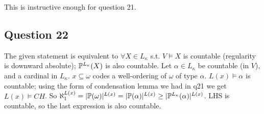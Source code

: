 \documentclass[a4paper]{article}
\begin{document}
This is instructive enough for question 21.

\subsection{Question 22}

The given statement is equivalent to $\forall X \in L_\kappa$ s.t. $V \vDash X$ is countable (regularity is downward absolute); $\P^{L_\kappa}(X)$ is also countable. Let $\alpha \in L_\kappa$ be countable (in $V$), and a  cardinal in $L_{\kappa}$. $x \subseteq \omega$ codes a well-ordering of $\omega$ of type $\alpha$. $L(x) \vDash \alpha$ is countable; using the form of condensation lemma we had in q21 we get $L(x) \vDash CH$. So $\aleph_1^{L(x)} = |\P(\omega)|^{L(x)} = |\P(\alpha)|^{L(x)} \geq 
|\P^{L_\kappa}(\alpha)|^{L(x)}$. LHS is countable, so the last expression is also countable.
\end{document}
